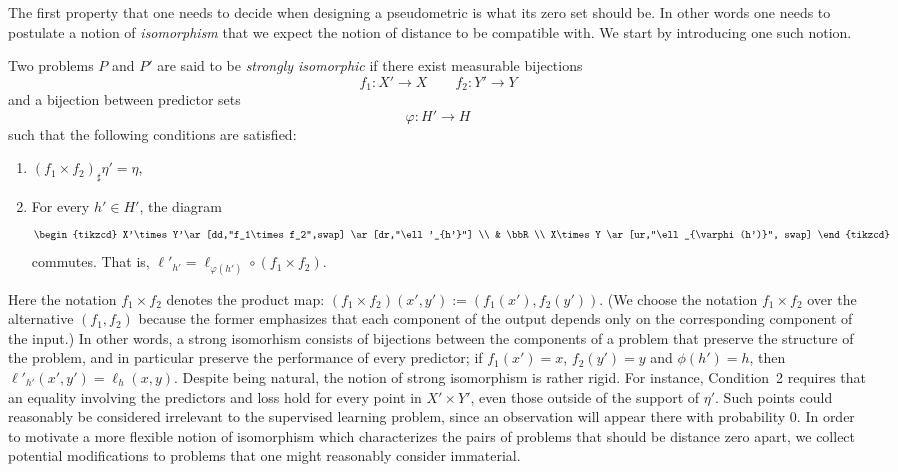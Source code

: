 \documentclass[twoside,11pt]{article}
\begin{document}
The first property that one needs to decide when designing a pseudometric is what its zero set should be. In other words one needs to postulate a notion of \emph{isomorphism} that we expect the notion of distance to be compatible with. We start by introducing one such notion.
\begin{definition}\label{def:strong-iso} Two problems $P$ and $P'$ are said to be \emph{strongly isomorphic}  if there exist measurable bijections
    \[f_1:X'\to X \qquad f_2:Y'\to Y\]
    and a bijection between predictor sets
    \[\varphi: H'\to H\]
    such that the following conditions are satisfied:
    \begin{enumerate}
        \item $(f_1\times f_2)_\sharp \eta' = \eta$, 
        \item For every $h'\in H'$, the diagram
        \[
        \begin{tikzcd}
            X'\times Y'\ar[dd,"f_1\times f_2",swap] \ar[dr,"\ell'_{h'}"]
            \\
            & \bbR
            \\
            X\times Y \ar[ur,"\ell_{\varphi(h')}", swap]
        \end{tikzcd}    
        \] 
        commutes. That is, $\ell'_{h'}= \ell_{\varphi(h')} \circ (f_1\times f_2)$. 
    \end{enumerate}
 \end{definition} 
Here the notation $f_1\times f_2$ denotes the product map: $(f_1\times f_2)(x',y') := (f_1(x'), f_2(y'))$. (We choose the notation $f_1\times f_2$ over the alternative $(f_1,f_2)$ because the former emphasizes that each component of the output depends only on the corresponding component of the input.) In other words, a strong isomorhism consists of bijections between the components of a problem that preserve the structure of the problem, and in particular preserve the performance of every predictor; if $f_1(x')=x$, $f_2(y')=y$ and $\phi(h')=h$, then $\ell'_{h'}(x',y') = \ell_h(x,y)$. Despite being natural, the notion of strong isomorphism is rather rigid.  For instance, Condition~2 requires that an equality involving the predictors and loss hold for every point in $X'\times Y'$, even those outside of the support of $\eta'$. Such points could reasonably be considered irrelevant to the supervised learning problem, since an observation will appear there with probability 0. In order to motivate a more flexible notion of isomorphism which characterizes the pairs of problems that should be distance zero apart, we collect potential modifications to problems that one might reasonably consider immaterial.
\end{document}
